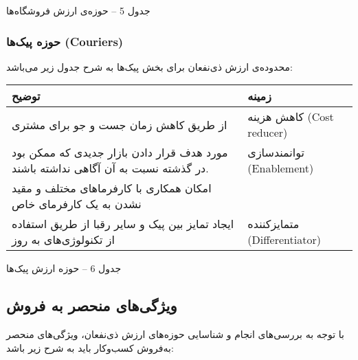 \documentclass[]{article}
\begin{document}
جدول 5 -- حوزه‌ی ارزش فروشگاه‌ها

\subsubsection{حوزه پیک‌ها
(Couriers)}\label{ux62dux648ux632ux647-ux67eux6ccux6a9ux647ux627-couriers}

محدوده‌ی ارزش ذی‌نفعان برای بخش پیک‌ها به شرح جدول زیر می‌باشد:

\begin{longtable}[]{@{}ll@{}}
\toprule
توضیح & زمینه\tabularnewline
\midrule
\endhead
از طریق کاهش زمان جست و جو برای مشتری & کاهش هزینه (Cost
reducer)\tabularnewline
مورد هدف قرار دادن بازار جدیدی که ممکن بود در گذشته نسبت به آن آگاهی
نداشته باشند. & توانمندسازی (Enablement)\tabularnewline
امکان همکاری با کارفرماهای مختلف و مقید نشدن به یک کارفرمای خاص
&\tabularnewline
ایجاد تمایز بین پیک و سایر رقبا از طریق استفاده از تکنولوژی‌های به روز &
متمایزکننده (Differentiator)\tabularnewline
\bottomrule
\end{longtable}

جدول 6 -- حوزه ارزش پیک‌ها

\subsection{ویژگی‌های منحصر به
فروش}\label{ux648ux6ccux698ux6afux6ccux647ux627ux6cc-ux645ux646ux62dux635ux631-ux628ux647-ux641ux631ux648ux634}

با توجه به بررسی‌های انجام و شناسایی حوزه‌های ارزش ذی‌نفعان، ویژگی‌های
منحصر به‌فروش کسب‌وکار باید به شرح زیر باشد:
\end{document}
